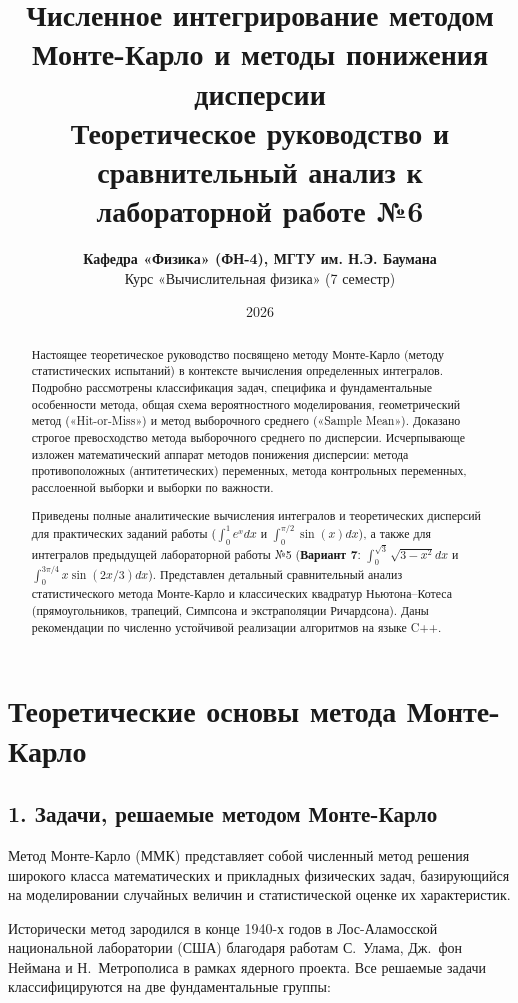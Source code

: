 \documentclass[11pt,a4paper]{article}
\title{\vspace{-10mm}\Huge\bfseries\color{primary} Численное интегрирование методом Монте-Карло и методы понижения дисперсии\\[3mm]
\Large\color{secondary} Теоретическое руководство и сравнительный анализ к лабораторной работе №6}
\author{\textbf{Кафедра «Физика» (ФН-4), МГТУ им. Н.Э. Баумана}\\
Курс «Вычислительная физика» (7 семестр)}
\date{2026}
\begin{document}
\maketitle

\begin{abstract}
\noindent Настоящее теоретическое руководство посвящено методу Монте-Карло (методу статистических испытаний) в контексте вычисления определенных интегралов. Подробно рассмотрены классификация задач, специфика и фундаментальные особенности метода, общая схема вероятностного моделирования, геометрический метод («Hit-or-Miss») и метод выборочного среднего («Sample Mean»). Доказано строгое превосходство метода выборочного среднего по дисперсии. Исчерпывающе изложен математический аппарат методов понижения дисперсии: метода противоположных (антитетических) переменных, метода контрольных переменных, расслоенной выборки и выборки по важности. 

Приведены полные аналитические вычисления интегралов и теоретических дисперсий для практических заданий работы ($\int_0^1 e^x dx$ и $\int_0^{\pi/2} \sin(x) dx$), а также для интегралов предыдущей лабораторной работы №5 (\textbf{Вариант 7}: $\int_0^{\sqrt{3}}\sqrt{3-x^2}dx$ и $\int_0^{3\pi/4}x\sin(2x/3)dx$). Представлен детальный сравнительный анализ статистического метода Монте-Карло и классических квадратур Ньютона--Котеса (прямоугольников, трапеций, Симпсона и экстраполяции Ричардсона). Даны рекомендации по численно устойчивой реализации алгоритмов на языке C++.
\end{abstract}

\tableofcontents
\newpage

\section{Теоретические основы метода Монте-Карло}

\subsection{1. Задачи, решаемые методом Монте-Карло}

Метод Монте-Карло (ММК) представляет собой численный метод решения широкого класса математических и прикладных физических задач, базирующийся на моделировании случайных величин и статистической оценке их характеристик.

Исторически метод зародился в конце 1940-х годов в Лос-Аламосской национальной лаборатории (США) благодаря работам С.~Улама, Дж.~фон Неймана и Н.~Метрополиса в рамках ядерного проекта. Все решаемые задачи классифицируются на две фундаментальные группы:
\end{document}
